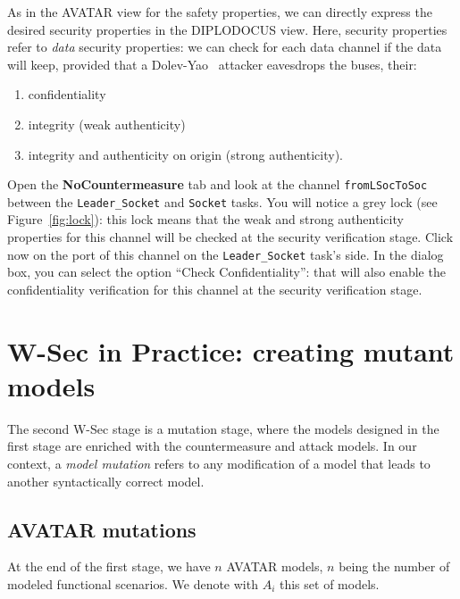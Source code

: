 \documentclass{article}
\begin{document}
As in the AVATAR view for the safety properties, we can directly express the desired security properties in the DIPLODOCUS view. Here, security properties refer to \emph{data} security properties: we can check for each data channel if the data will keep, provided that a Dolev-Yao~\cite{dolevyao} attacker eavesdrops the buses, their:
\begin{enumerate}
	\item confidentiality
	\item integrity (weak authenticity)
	\item integrity and authenticity on origin (strong authenticity).
\end{enumerate}
Open the \textbf{NoCountermeasure} tab and look at the channel \texttt{fromLSocToSoc} between the \texttt{Leader\_Socket} and \texttt{Socket} tasks. You will notice a grey lock (see Figure~\ref{fig:lock}): this lock means that the weak and strong authenticity properties for this channel will be checked at the security verification stage. Click now on the port of this channel on the \texttt{Leader\_Socket} task's side. In the dialog box, you can select the option ``Check Confidentiality'': that will also enable the confidentiality verification for this channel at the security verification stage.



\section{W-Sec in Practice: creating mutant models}

The second W-Sec stage is a mutation stage, where the models designed in the first stage are enriched with the countermeasure and attack models. In our context, a \emph{model mutation} refers to any modification of a model that leads to another syntactically correct model.

\subsection{AVATAR mutations}

At the end of the first stage, we have $n$ AVATAR models, $n$ being the number of modeled functional scenarios. We denote with $A_i$ this set of models.
\end{document}

